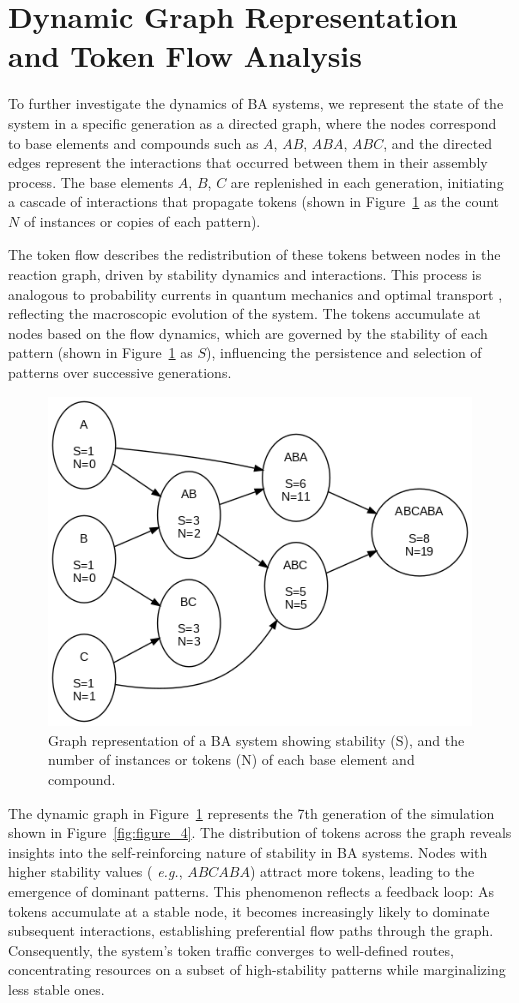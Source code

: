 \documentclass[preprint,12pt]{elsarticle}
\begin{document}
\section{Dynamic Graph Representation and Token Flow Analysis}

To further investigate the dynamics of BA systems, we represent the state of the system in a specific generation as a directed graph, where the nodes correspond to base elements and compounds such as $A$, $AB$, $ABA$, $ABC$, and the directed edges represent the interactions that occurred between them in their assembly process. The base elements $A$, $B$, $C$ are replenished in each generation, initiating a cascade of interactions that propagate tokens (shown in Figure~\ref{fig:figure_5} as the count $N$ of instances or copies of each pattern). 

The token flow describes the redistribution of these tokens between nodes in the reaction graph, driven by stability dynamics and interactions. This process is analogous to probability currents in quantum mechanics \cite{feynman1965quantum} and optimal transport \cite{villani2008optimal}, reflecting the macroscopic evolution of the system. The tokens accumulate at nodes based on the flow dynamics, which are governed by the stability of each pattern (shown in Figure~\ref{fig:figure_5} as $S$), influencing the persistence and selection of patterns over successive generations.


\begin{figure}[h]
    \centering
    \includegraphics[width=0.7\linewidth]{figure_5.png}
    \caption{Graph representation of a BA system showing stability (S), and the number of instances or tokens (N) of each base element and compound.}
    \label{fig:figure_5}
\end{figure}

The dynamic graph in Figure~\ref{fig:figure_5} represents the 7th generation of the simulation shown in Figure~\ref{fig:figure_4}. The distribution of tokens across the graph reveals insights into the self-reinforcing nature of stability in BA systems. Nodes with higher stability values (\textit{ e.g.}, $ABCABA$) attract more tokens, leading to the emergence of dominant patterns. This phenomenon reflects a feedback loop: As tokens accumulate at a stable node, it becomes increasingly likely to dominate subsequent interactions, establishing preferential flow paths through the graph. Consequently, the system's token traffic converges to well-defined routes, concentrating resources on a subset of high-stability patterns while marginalizing less stable ones.
\end{document}
